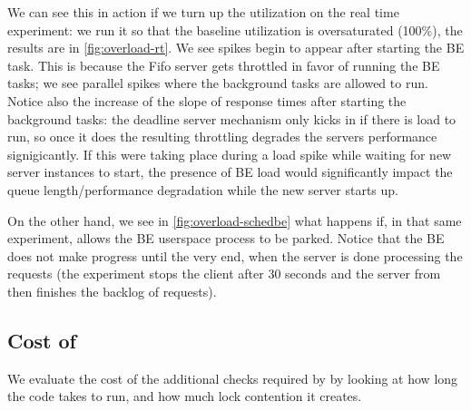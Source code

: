 We can see this in action if we turn up the utilization on the real time
experiment: we run it so that the baseline utilization is oversaturated (100\%),
the results are in \autoref{fig:overload-rt}. We see spikes begin to
appear after starting the BE task. This is because the Fifo server gets
throttled in favor of running the BE tasks; we see parallel spikes where the
background tasks are allowed to run. Notice also the increase of the slope of
response times after starting the background tasks: the deadline server
mechanism only kicks in if there is load to run, so once it does the resulting
throttling degrades the servers performance signigicantly. If this were taking
place during a load spike while waiting for new server instances to start, the
presence of BE load would significantly impact the queue length/performance
degradation while the new server starts up.

On the other hand, we see in \autoref{fig:overload-schedbe} what happens
if, in that same experiment, \schedbe{} allows the BE userspace process to be
parked. Notice that the BE does not make progress until the very end, when the
server is done processing the requests (the experiment stops the client after 30
seconds and the server from then finishes the backlog of requests).



\subsection{Cost of \schedbe{}}

We evaluate the cost of the additional checks required by \schedbe{} by looking
at how long the code takes to run, and how much lock contention it creates.